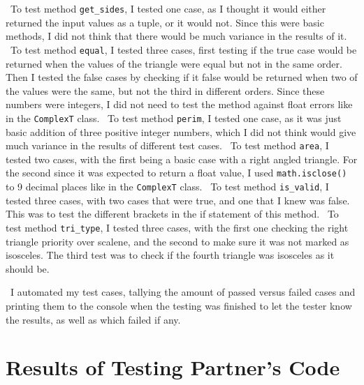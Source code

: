 \documentclass[12pt]{article}
\begin{document}
~\newline\noindent To test method \verb|get_sides|, I tested one case, as I thought 
it would either returned the input values as a tuple, or it would not. Since this 
were basic methods, I did not think that there would be much variance in the results 
of it. 
~\newline\noindent To test method \verb|equal|, I tested three cases, first testing 
if the true case would be returned when the values of the triangle were equal but 
not in the same order. Then I tested the false cases by checking if it false would 
be returned when two of the values were the same, but not the third in different 
orders. Since these numbers were integers, I did not need to test the method 
against float errors like in the \verb|ComplexT| class. 
~\newline\noindent To test method \verb|perim|, I tested one case, as it was just 
basic addition of three positive integer numbers, which I did not think would 
give much variance in the results of different test cases. 
~\newline\noindent To test method \verb|area|, I tested two cases, with the first 
being a basic case with a right angled triangle. For the second since it was 
expected to return a float value, I used \verb|math.isclose()| to 9 decimal 
places like in the \verb|ComplexT| class. 
~\newline\noindent To test method \verb|is_valid|, I tested three cases, with 
two cases that were true, and one that I knew was false. This was to test the 
different brackets in the if statement of this method. 
~\newline\noindent To test method \verb|tri_type|, I tested three cases, with 
the first one checking the right triangle priority over scalene, and the second 
to make sure it was not marked as isosceles. The third test was to check if the 
fourth triangle was isosceles as it should be. 

~\newline\noindent I automated my test cases, tallying the amount of passed 
versus failed cases and printing them to the console when the testing was 
finished to let the tester know the results, as well as which failed if any. 

\section{Results of Testing Partner's Code}
\end{document}
